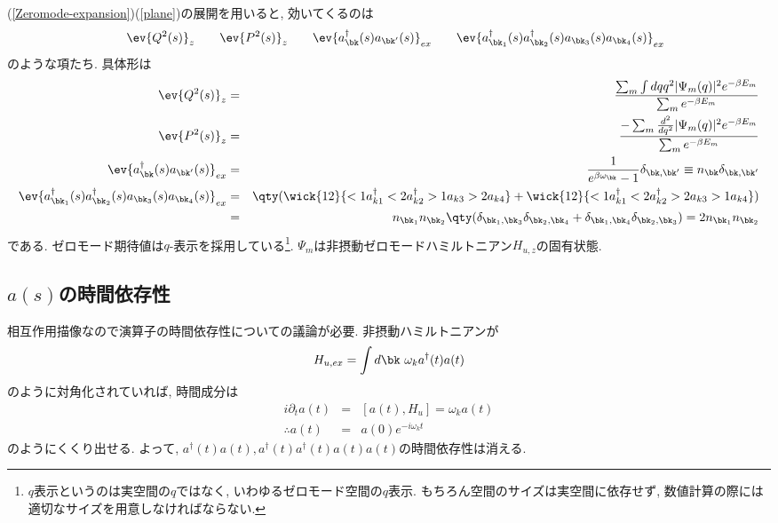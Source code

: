 \documentclass[10.5pt,a4paper]{jreport}
\begin{document}
(\ref{Zeromode-expansion})(\ref{plane})の展開を用いると, 効いてくるのは
\begin{eqnarray}
  &&\ev{Q^2(s)}_z\hspace{0.7cm}\ev{P^2(s)}_z\hspace{0.7cm}\ev{a_{\bk}^\dagger(s) a_{\bk'}(s)}_{ex}\hspace{0.7cm}\ev{a_{\bk_1}^\dagger(s)a_{\bk_2}^\dagger(s) a_{\bk_3}(s)a_{\bk_4}(s)}_{ex}
\end{eqnarray}
のような項たち. 具体形は
\begin{eqnarray}
  \ev{Q^2(s)}_z &=& \frac{\sum_m\int dqq^2|\Psi_m(q)|^2e^{-\beta E_m}}{\sum_me^{-\beta E_m}}\\
  \ev{P^2(s)}_z &=& \frac{-\sum_m\frac{d^2}{dq^2}|\Psi_m(q)|^2e^{-\beta E_m}}{\sum_me^{-\beta E_m}}\\
  \ev{a_{\bk}^\dagger(s) a_{\bk'}(s)}_{ex} &=& \frac{1}{e^{\beta\omega_{\bk}}-1}\delta_{\bk, \bk'} \equiv n_{\bk}\delta_{\bk, \bk'}\\
  \nonumber  \ev{a_{\bk_1}^\dagger(s)a_{\bk_2}^\dagger(s) a_{\bk_3}(s)a_{\bk_4}(s)}_{ex} &=& \qty(\wick{12}{<1a^\dagger_{k1}<2a^\dagger_{k2}>1a_{k3}>2a_{k4}} + \wick{12}{<1a^\dagger_{k1}<2a^\dagger_{k2}>2a_{k3}>1a_{k4}})\\
  &=& n_{\bk_1}n_{\bk_2}\qty(\delta_{\bk_1, \bk_3}\delta_{\bk_2, \bk_4} + \delta_{\bk_1, \bk_4}\delta_{\bk_2, \bk_3}) = 2n_{\bk_1}n_{\bk_2}
\end{eqnarray}
である. ゼロモード期待値は$q$-表示を採用している\footnote{$q$表示というのは実空間の$q$ではなく, いわゆるゼロモード空間の$q$表示. もちろん空間のサイズは実空間に依存せず, 数値計算の際には適切なサイズを用意しなければならない. }. $\Psi_m$は非摂動ゼロモードハミルトニアン$H_{u, z}$の固有状態.

\subsection{$a(s)$の時間依存性}
相互作用描像なので演算子の時間依存性についての議論が必要. 非摂動ハミルトニアンが
\begin{eqnarray}
  H_{u, ex} = \int d\bk\ \omega_k a^\dagger(t) a(t)
\end{eqnarray}
のように対角化されていれば, 時間成分は
\begin{eqnarray}
  i\partial_ta(t) &=& [a(t), H_u] = \omega_k a(t)\\
  \therefore a(t) &=& a(0)e^{-i\omega_k t}
\end{eqnarray}
のようにくくり出せる. よって, $a^\dagger(t) a(t), a^\dagger(t) a^\dagger(t) a(t)a(t)$の時間依存性は消える. 
\end{document}
